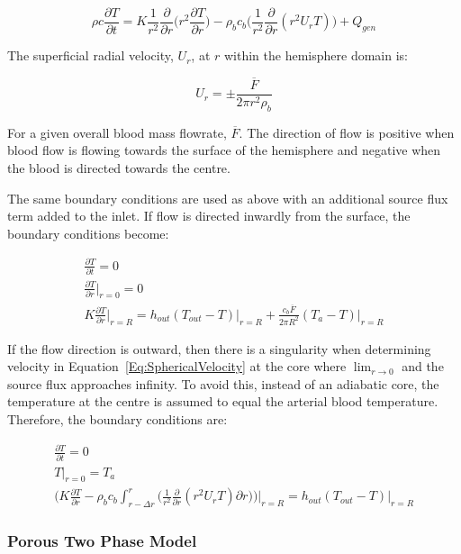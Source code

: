 \documentclass[11pt,english,a4paper,twoside,openright]{report}
\begin{document}
{{{{{{{{\begin{equation}
\rho c\frac{\partial T}{\partial t} = K\frac{1}{r^{2}}\frac{\partial}{\partial r}\bigg(r^{2}\frac{\partial T}{\partial r}\bigg)-\rho_{b}c_{b}\bigg(\frac{1}{r^{2}}\frac{\partial}{\partial r}(r^{2}U_{r}T) \bigg) + Q_{gen}
\end{equation}

The superficial radial velocity, $U_{r}$, at $r$ within the hemisphere domain is:

\begin{equation}
U_{r} = \pm\frac{\overline{F}}{2\pi r^{2}\rho_{b}}
\label{Eq:SphericalVelocity}
\end{equation}

For a given overall blood mass flowrate, $\overline{F}$. The direction of flow is positive when blood flow is flowing towards the surface of the hemisphere and negative when the blood is directed towards the centre. 

The same boundary conditions are used as above with an additional source flux term added to the inlet. If flow is directed inwardly from the surface, the boundary conditions become:

\begin{gather}
\frac{\partial T}{\partial t} = 0 \\
\frac{\partial T}{\partial r}\biggr|_{r=0} = 0 \\
K\frac{\partial T}{\partial r}\biggr|_{r=R} = h_{out}(T_{out}-T)\bigr|_{r=R} + \frac{c_{b}\overline{F}}{2\pi R^{2}}(T_{a} - T)\bigr|_{r=R}
\end{gather}

If the flow direction is outward, then there is a singularity when determining velocity in Equation~\ref{Eq:SphericalVelocity} at the core where $\lim_{r\to0}$ and the source flux approaches infinity. To avoid this, instead of an adiabatic core, the temperature at the centre is assumed to equal the arterial blood temperature. Therefore, the boundary conditions are:

\begin{gather}
\frac{\partial T}{\partial t} = 0 \\
T\bigr|_{r=0}=T_{a} \\
\bigg(K\frac{\partial T}{\partial r} - \rho_{b}c_{b}\int_{r-\Delta r}^{r}\bigg(\frac{1}{r^{2}}\frac{\partial}{\partial r}(r^{2}U_{r}T)\partial r\bigg)\bigg)\biggr|_{r=R} = h_{out}(T_{out}-T)\bigr|_{r=R}
\end{gather}

\subsubsection{Porous Two Phase Model}

}}}}}}}}
\end{document}
